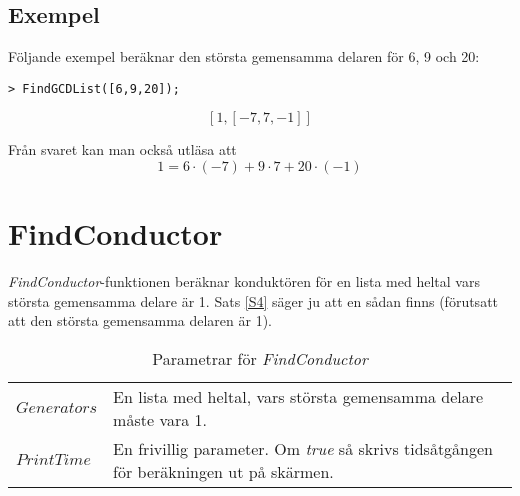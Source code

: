 \subsection{Exempel}

Följande exempel beräknar den största gemensamma delaren för 6, 9 och 20:

\begin{verbatim}
> FindGCDList([6,9,20]);
\end{verbatim}
\[\left[1, \left[-7, 7, -1\right]\right]\]

Från svaret kan man också utläsa att
\[1 = 6 \cdot (-7) + 9 \cdot 7 + 20 \cdot (-1)\]

\section{FindConductor}

\emph{FindConductor}-funktionen beräknar konduktören för en lista med heltal vars största gemensamma delare är 1. Sats \ref{S4} säger ju att en sådan finns (förutsatt att den största gemensamma delaren är 1).

\begin{table}[h]
\caption{Parametrar för \emph{FindConductor}}
\begin{center}
\begin{tabular}{|l|p{9cm}|}
\hline
$Generators$ & En lista med heltal, vars största gemensamma delare måste vara 1.\\
$PrintTime$ & En frivillig parameter. Om \emph{true} så skrivs tidsåtgången för beräkningen ut på skärmen.\\
\hline
\end{tabular}
\end{center}
\end{table}

